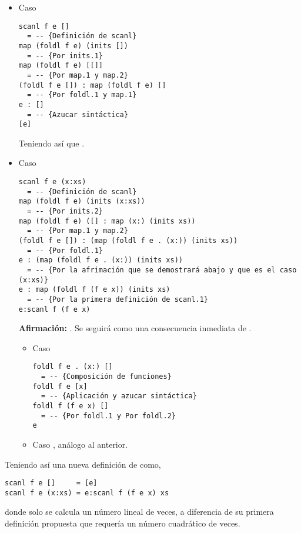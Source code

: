 \begin{itemize}
\item Caso \hsCode{[]}
\begin{verbatim}
scanl f e []
  = -- {Definición de scanl}
map (foldl f e) (inits [])
  = -- {Por inits.1}
map (foldl f e) [[]]
  = -- {Por map.1 y map.2}
(foldl f e []) : map (foldl f e) []
  = -- {Por foldl.1 y map.1}
e : []
  = -- {Azucar sintáctica}
[e]
\end{verbatim}

Teniendo así que .

\item Caso 
\begin{verbatim}
scanl f e (x:xs)
  = -- {Definición de scanl}
map (foldl f e) (inits (x:xs))
  = -- {Por inits.2}
map (foldl f e) ([] : map (x:) (inits xs))
  = -- {Por map.1 y map.2}
(foldl f e []) : (map (foldl f e . (x:)) (inits xs))
  = -- {Por foldl.1}
e : (map (foldl f e . (x:)) (inits xs))
  = -- {Por la afrimación que se demostrará abajo y que es el caso (x:xs)}
e : map (foldl f (f e x)) (inits xs)
  = -- {Por la primera definición de scanl.1}
e:scanl f (f e x)
\end{verbatim}

\textbf{Afirmación:} . Se seguirá como una consecuencia
inmediata de .

\begin{itemize}
\item Caso 
\begin{verbatim}
foldl f e . (x:) []
  = -- {Composición de funciones}
foldl f e [x]
  = -- {Aplicación y azucar sintáctica}
foldl f (f e x) []
  = -- {Por foldl.1 y Por foldl.2}
e
\end{verbatim}

\item Caso , análogo al anterior.
\end{itemize}
\end{itemize}

Teniendo así una nueva definición de  como,
\begin{verbatim}
scanl f e []     = [e]
scanl f e (x:xs) = e:scanl f (f e x) xs
\end{verbatim}

donde  solo se calcula un número lineal de veces, a diferencia de su primera definición
propuesta que requería un número cuadrático de veces.

